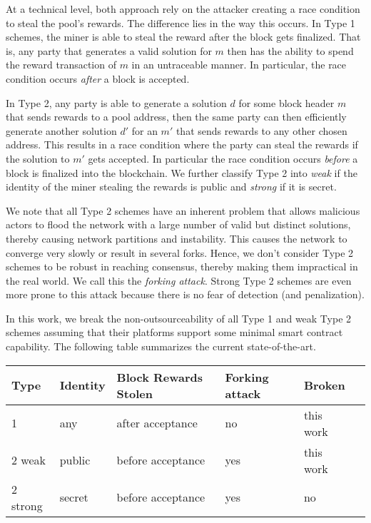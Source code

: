 \documentclass[11pt]{article}
\begin{document}
At a technical level, both approach rely on the attacker creating a race condition to steal the pool's rewards. The difference lies in the way this occurs. In Type 1 schemes, the miner is able to steal the reward after the block gets finalized. That is, any party that generates a valid solution for $m$ then has the ability to spend the reward transaction of $m$ in an untraceable manner. In particular, the race condition occurs {\em after} a block is accepted. 

In Type 2, any party is able to generate a solution $d$ for some block header $m$ that sends rewards to a pool address, then the same party can then efficiently generate another solution $d'$ for an $m'$ that sends rewards to any other chosen address. This results in a race condition where the party can steal the rewards if the solution to $m'$ gets accepted. In particular the race condition occurs {\em before} a block is finalized into the blockchain. We further classify Type 2 into {\em weak} if the identity of the miner stealing the rewards is public and {\em strong} if it is secret. 


We note that all Type 2 schemes have an inherent problem that allows malicious actors to flood the network with a large number of valid but distinct solutions, thereby causing network partitions and instability. This causes the network to converge very slowly or result in several forks. Hence, we don't consider Type 2 schemes to be robust in reaching consensus, thereby making them impractical in the real world. We call this the {\em forking attack}. Strong Type 2 schemes are even more prone to this attack because there is no fear of detection (and penalization). 

In this work, we break the non-outsourceability of all Type 1 and weak Type 2 schemes assuming that their platforms support
some minimal smart contract capability. The following table summarizes the current state-of-the-art. 


	\begin{tabular}{llllll}
		  Type     & Identity   & Block Rewards Stolen       & Forking attack & Broken \\\hline
		  1        & any              & after acceptance   & no             & this work\\
		  2 weak   & public           & before acceptance  & yes            & this work\\
		  2 strong & secret           & before acceptance  & yes            & no
	\end{tabular}
\end{document}
